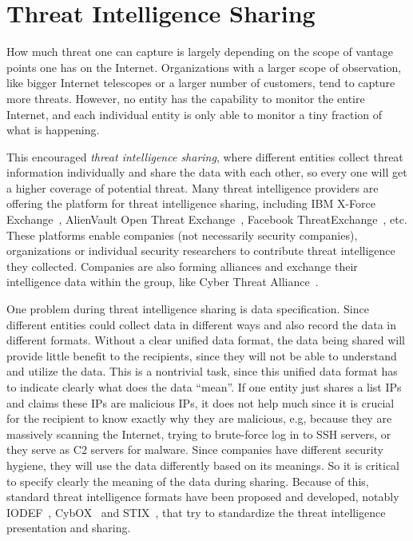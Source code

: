 





\section{Threat Intelligence Sharing}
\label{sec:threat_intel_sharing}

How much threat one can capture is largely depending on the scope of
vantage points one has on the Internet. Organizations with a larger scope of 
observation,
like bigger Internet telescopes or a larger number of customers, tend to
capture more threats. However, no entity has the capability to monitor
the entire Internet, and each individual entity is only able to monitor a
tiny fraction of what is happening. 

This encouraged \textit{threat intelligence sharing}, where different 
entities collect threat information individually and share the data
with each other, so every one will get a higher coverage of potential 
threat. Many threat intelligence providers are offering the platform
for threat intelligence sharing, including IBM X-Force 
Exchange~\cite{ibmxforce}, AlienVault Open Threat 
Exchange~\cite{alienvaultotx}, Facebook 
ThreatExchange~\cite{facebookthreatexchange}, etc. These platforms
enable companies (not necessarily security companies), organizations 
or individual security researchers to contribute threat intelligence 
they collected. Companies are also forming alliances and exchange their
intelligence data within the group, like Cyber Threat
Alliance~\cite{cyberthreatalliance}.

One problem during threat intelligence sharing is data specification.
Since different entities could collect data in different ways and
also record the data in different formats. Without a clear unified
data format, the data being shared will provide little benefit to
the recipients, since they will not be able to understand and utilize
the data. This is a nontrivial task, since this unified data format
has to indicate clearly what does the data ``mean''. If one entity
just shares a list IPs and claims these IPs are malicious IPs, it
does not help much since it is crucial for the recipient to know
exactly why they are malicious, e.g, because they are massively 
scanning the Internet, trying to brute-force log in to SSH servers,
or they serve as C2 servers for malware. Since companies have different 
security hygiene, they will use the data differently based on its
meanings. So it is critical to specify clearly the meaning of the
data during sharing. Because of this, standard threat intelligence 
formats have been proposed and developed, 
notably IODEF~\cite{IODEF}, CybOX~\cite{CybOX} and STIX~\cite{STIX}, 
that try to standardize the threat intelligence presentation and sharing. 


